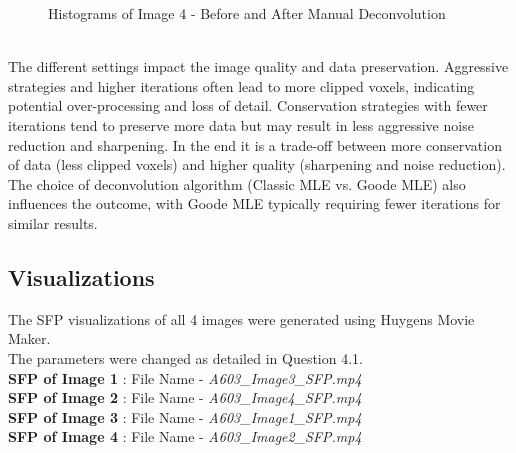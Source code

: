 \documentclass{article}
\begin{document}
\begin{figure}[h!]
\centering
{}
\vspace{5 mm}
\caption{Histograms of Image 4 - Before and After Manual Deconvolution}
\label{fig:manual-deconvolve-image4-histogram}
\end{figure}
\\
The different settings impact the image quality and data preservation. Aggressive strategies and higher iterations often lead to more clipped voxels, indicating potential over-processing and loss of detail. Conservation strategies with fewer iterations tend to preserve more data but may result in less aggressive noise reduction and sharpening. In the end it is a trade-off between more conservation of data (less clipped voxels) and higher quality (sharpening and noise reduction). The choice of deconvolution algorithm (Classic MLE vs. Goode MLE) also influences the outcome, with Goode MLE typically requiring fewer iterations for similar results.

\subsection*{Visualizations}
The SFP visualizations of all 4 images were generated using Huygens Movie Maker. 
\\The parameters were changed as detailed in Question 4.1. 
\medskip\\
\textbf{SFP of Image 1} : File Name - \textit{A603\_Image3\_SFP.mp4}\\
\textbf{SFP of Image 2} : File Name - \textit{A603\_Image4\_SFP.mp4}\\
\textbf{SFP of Image 3} : File Name - \textit{A603\_Image1\_SFP.mp4}\\
\textbf{SFP of Image 4} : File Name - \textit{A603\_Image2\_SFP.mp4}\\
\end{document}

